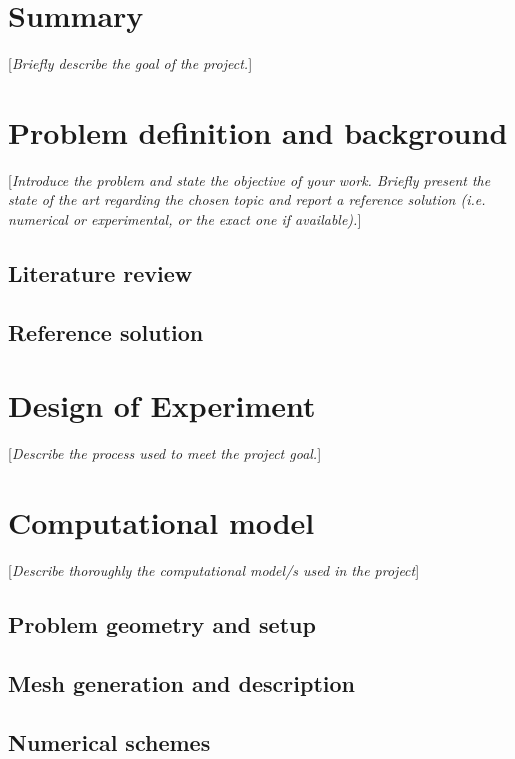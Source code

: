 \documentclass[10pt,english, openany]{book}
\begin{document}
\tableofcontents{}

\mainmatter

\chapter{Summary}\label{chapt:sum}
[\textit{Briefly describe the goal of the project.}]
\chapter{Problem definition and background}
[\textit{Introduce the problem and state the objective of your work. Briefly present the state of the art regarding the chosen topic and report a reference solution (i.e. numerical or experimental, or the exact one if available).}]
\section{Literature review}
\section{Reference solution}

\chapter{Design of Experiment}\label{chapt:doe}
[\textit{Describe the process used to meet the project goal.}]

\chapter{Computational model}\label{chapt:model}
[\textit{Describe thoroughly the computational model/s used in the project}]
\section{Problem geometry and setup}
\section{Mesh generation and description}
\section{Numerical schemes}
\end{document}
